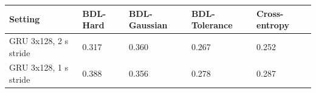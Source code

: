 \begin{tabular}{lllll}
\toprule
Setting & BDL-Hard & BDL-Gaussian & BDL-Tolerance & Cross-entropy \\
\midrule
GRU 3x128, 2 s stride & 0.317 & 0.360 & 0.267 & 0.252 \\
GRU 3x128, 1 s stride & 0.388 & 0.356 & 0.278 & 0.287 \\
\bottomrule
\end{tabular}
